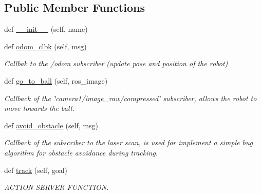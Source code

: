 \subsection*{Public Member Functions}
\begin{DoxyCompactItemize}
\item 
def \hyperlink{classtrackingBall_1_1Tracking_afac83c606a2539723c13ed9d08385729}{\+\_\+\+\_\+init\+\_\+\+\_\+} (self, name)
\item 
def \hyperlink{classtrackingBall_1_1Tracking_ae942d974bcf15ea113ddbdb845b93914}{odom\+\_\+clbk} (self, msg)
\begin{DoxyCompactList}\small\item\em Callbak to the /odom subscriber (update pose and position of the robot) \end{DoxyCompactList}\item 
def \hyperlink{classtrackingBall_1_1Tracking_a1d98727a3d632e7e5ae973cb3417837a}{go\+\_\+to\+\_\+ball} (self, ros\+\_\+image)
\begin{DoxyCompactList}\small\item\em Callback of the \char`\"{}camera1/image\+\_\+raw/compressed\char`\"{} subscriber, allows the robot to move towards the ball. \end{DoxyCompactList}\item 
def \hyperlink{classtrackingBall_1_1Tracking_aa69933a4bd0f18dd53c4d2db71c0d691}{avoid\+\_\+obstacle} (self, msg)
\begin{DoxyCompactList}\small\item\em Callback of the subscriber to the laser scan, is used for implement a simple bug algorithm for obstacle avoidance during tracking. \end{DoxyCompactList}\item 
def \hyperlink{classtrackingBall_1_1Tracking_aab79d6fd3ebcc645ac180b827ab8a4ad}{track} (self, goal)
\begin{DoxyCompactList}\small\item\em A\+C\+T\+I\+ON S\+E\+R\+V\+ER F\+U\+N\+C\+T\+I\+ON. \end{DoxyCompactList}\end{DoxyCompactItemize}
